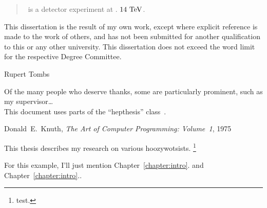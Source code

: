 

\begin{abstract}
\atlas\ is a detector experiment at \cern. $14~\eV[T]$.
\end{abstract}


\begin{declaration}
This dissertation is the result of my own work, except where explicit
reference is made to the work of others, and has not been submitted
for another qualification to this or any other university. This
dissertation does not exceed the word limit for the respective Degree
Committee.
\vspace*{1cm}
\begin{flushright}
Rupert Tombs
\end{flushright}
\end{declaration}


\begin{acknowledgements}
Of the many people who deserve thanks, some are particularly prominent,
such as my supervisor\dots
\\
This document uses parts of the ``hepthesis'' class~\cite{hepthesis}.
\end{acknowledgements}


\begin{preface}
\begin{singlespacing}
\begin{epigraphs}
%
{Donald~E.~Knuth,
\textit{The Art of Computer Programming: Volume~1},
1975~\cite{knuth1975art}}
\end{epigraphs}
\end{singlespacing}


This thesis describes my research on various hoozywotsists.%
\footnote{test.}

\noindent
For this example, I'll just mention Chapter~\ref{chapter:intro}.
and Chapter~\ref{chapter:intro}..
\end{preface}


\tableofcontents


\thispagestyle{empty}

